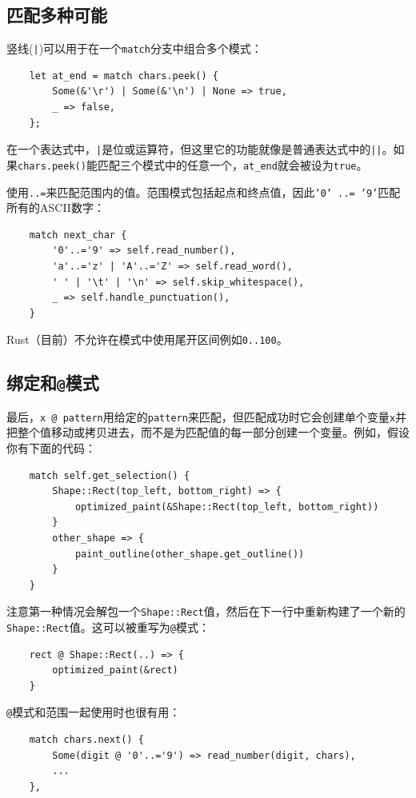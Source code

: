 \subsection{匹配多种可能}
竖线(\texttt{|})可以用于在一个\texttt{match}分支中组合多个模式：
\begin{verbatim}
    let at_end = match chars.peek() {
        Some(&'\r') | Some(&'\n') | None => true,
        _ => false,
    };
\end{verbatim}

在一个表达式中，\texttt{|}是位或运算符，但这里它的功能就像是普通表达式中的\texttt{||}。如果\texttt{chars.peek()}能匹配三个模式中的任意一个，\texttt{at\_end}就会被设为\texttt{true}。

使用\texttt{..=}来匹配范围内的值。范围模式包括起点和终点值，因此\texttt{'0' ..= '9'}匹配所有的ASCII数字：
\begin{verbatim}
    match next_char {
        '0'..='9' => self.read_number(),
        'a'..='z' | 'A'..='Z' => self.read_word(),
        ' ' | '\t' | '\n' => self.skip_whitespace(),
        _ => self.handle_punctuation(),
    }
\end{verbatim}

Rust（目前）不允许在模式中使用尾开区间例如\texttt{0..100}。

\subsection{绑定和\texttt{@}模式}
最后，\texttt{x @ pattern}用给定的\texttt{pattern}来匹配，但匹配成功时它会创建单个变量\texttt{x}并把整个值移动或拷贝进去，而不是为匹配值的每一部分创建一个变量。例如，假设你有下面的代码：
\begin{verbatim}
    match self.get_selection() {
        Shape::Rect(top_left, bottom_right) => {
            optimized_paint(&Shape::Rect(top_left, bottom_right))
        }
        other_shape => {
            paint_outline(other_shape.get_outline())
        }
    }    
\end{verbatim}
注意第一种情况会解包一个\texttt{Shape::Rect}值，然后在下一行中重新构建了一个新的\\
\texttt{Shape::Rect}值。这可以被重写为\texttt{@}模式：
\begin{verbatim}
    rect @ Shape::Rect(..) => {
        optimized_paint(&rect)
    }
\end{verbatim}

\texttt{@}模式和范围一起使用时也很有用：
\begin{verbatim}
    match chars.next() {
        Some(digit @ '0'..='9') => read_number(digit, chars),
        ...
    },
\end{verbatim}

